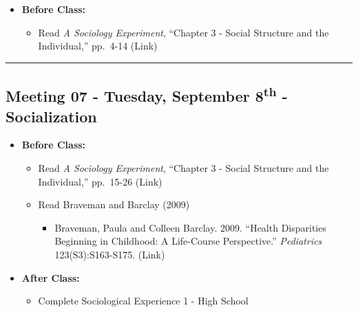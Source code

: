 \documentclass[
]{book}
\providecommand{\tightlist}{%
  \setlength{\itemsep}{0pt}\setlength{\parskip}{0pt}}
\begin{document}
\begin{itemize}
\tightlist
\item
  \textbf{Before Class:}

  \begin{itemize}
  \tightlist
  \item
    Read \emph{A Sociology Experiment}, ``Chapter 3 - Social Structure and the Individual,'' pp.~4-14 (Link)
  \end{itemize}
\end{itemize}

\begin{center}\rule{0.5\linewidth}{0.5pt}\end{center}

\hypertarget{meeting-07---tuesday-september-8th---socialization}{%
\subsection*{\texorpdfstring{Meeting 07 - Tuesday, September 8\textsuperscript{th} - Socialization}{Meeting 07 - Tuesday, September 8th - Socialization}}\label{meeting-07---tuesday-september-8th---socialization}}

\begin{itemize}
\tightlist
\item
  \textbf{Before Class:}

  \begin{itemize}
  \tightlist
  \item
    Read \emph{A Sociology Experiment}, ``Chapter 3 - Social Structure and the Individual,'' pp.~15-26 (Link)
  \item
    Read Braveman and Barclay (2009)

    \begin{itemize}
    \tightlist
    \item
      Braveman, Paula and Colleen Barclay. 2009. ``Health Disparities Beginning in Childhood: A Life-Course Perspective.'' \emph{Pediatrics} 123(S3):S163-S175. (Link)
    \end{itemize}
  \end{itemize}
\item
  \textbf{After Class:}

  \begin{itemize}
  \tightlist
  \item
    Complete Sociological Experience 1 - High School
  \end{itemize}
\end{itemize}
\end{document}
